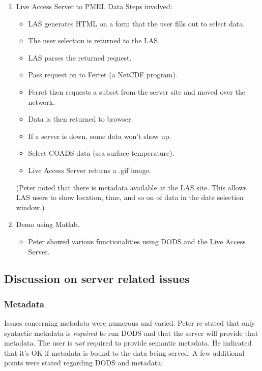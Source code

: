 \begin{enumerate}
\item  Live Access Server to PMEL Data
  Steps involved:
  \begin{itemize}
  \item LAS generates HTML on a form that the user fills out to select
    data.
  \item The user selection is returned to the LAS.
  \item LAS parses the returned request.
  \item Pass request on to Ferret (a NetCDF program).
  \item Ferret then requests a subset from the server site and moved
    over the network.
  \item Data is then returned to browser.
  \item If a server is down, some data won't show up.
  \item Select COADS data (sea surface temperature).
  \item Live Access Server returns a .gif image.
\end{itemize}

(Peter noted that there is metadata available at the LAS site.  This
allows LAS users to show location, time, and so on of data in the date
selection window.)

\item Demo using Matlab.
\begin{itemize}
  \item Peter showed various functionalities using DODS and the Live Access Server.
\end{itemize}
\end{enumerate}

\subsection{Discussion on server related issues}

\subsubsection{Metadata}

Issues concerning metadata were numerous and varied.  Peter re-stated
that only syntactic metadata is \emph{required} to run DODS and that
the server will provide that metadata.  The user is \emph{not} required to
provide semantic metadata.  He indicated that it's OK if metadata is
bound to the data being served.  A few additional points were stated
regarding DODS and metadata:

